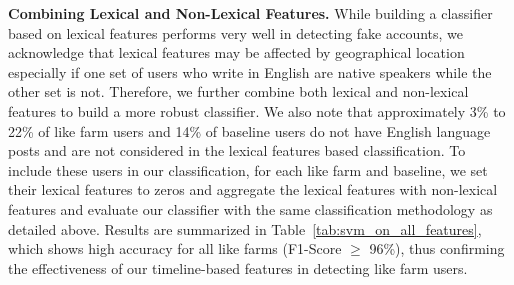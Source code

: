 \documentclass[twocolumn,10pt,letterpaper]{article}
\newcommand{\descr}[1]{\smallskip\noindent\textbf{#1}}
\begin{document}
\begin{table*}[!t]
\tabcolsep=0.11cm
  \begin{center}
\vspace{-0.15cm}
    \caption{Effectiveness of both lexical and non-lexical features (+SVM) in detecting like farm users.}
    \label{tab:svm_on_all_features}
      \end{center}
\end{table*}
%
%
%
%
%
%
%
%
%
%
%
%
%
%
%
%
%
%
%
%
%
%


\descr{Combining Lexical and Non-Lexical Features.}
While building a classifier based on lexical features performs very well in detecting fake accounts, we acknowledge that lexical features may be affected by geographical location especially if one set of users who write in English are native speakers while the other set is not.
Therefore, we further combine both lexical and non-lexical features to build a more robust classifier.
We also note that approximately 3\% to 22\% of like farm users and 14\% of baseline users do not have English language posts and are not considered in the lexical features based classification.
To include these users in our classification, for each like farm and baseline, we set their lexical features to zeros and aggregate the lexical features with non-lexical features and evaluate our classifier with the same classification methodology as detailed above.
Results are summarized in Table~\ref{tab:svm_on_all_features}, which shows high accuracy for all like farms (F1-Score $\geq$ 96\%), thus confirming the effectiveness of our timeline-based features in detecting like farm users.
\end{document}

